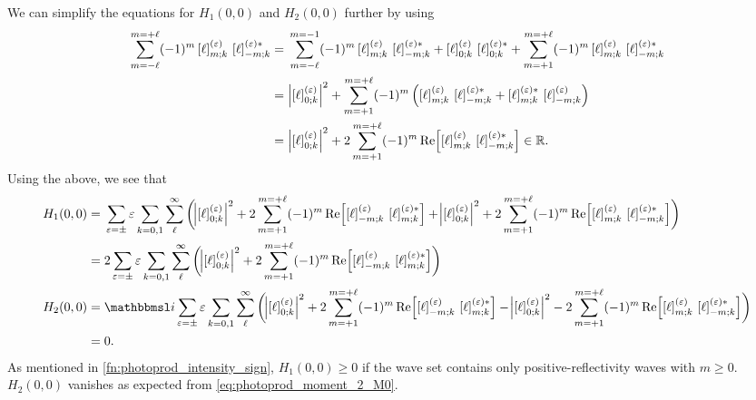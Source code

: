 We can simplify the equations for $H_1(0, 0)$ and $H_2(0, 0)$ further
by using
\begin{align}
  \sum_{m = -\ell}^{m = +\ell}
  (-1)^m \sBrk{\ell}^{(\refl)}_{m; k}\, \sBrk{\ell}^{(\refl) *}_{{-m}; k}
  ={}& \sum_{m = -\ell}^{m = -1}
  (-1)^m \sBrk{\ell}^{(\refl)}_{m; k}\, \sBrk{\ell}^{(\refl) *}_{{-m}; k}
  + \sBrk{\ell}^{(\refl)}_{0; k}\, \sBrk{\ell}^{(\refl) *}_{0; k}
  + \sum_{m = +1}^{m = +\ell}
  (-1)^m \sBrk{\ell}^{(\refl)}_{m; k}\, \sBrk{\ell}^{(\refl) *}_{{-m}; k} \nonumber
  \\
  ={}& \Abs[2]{\sBrk{\ell}^{(\refl)}_{0; k}}^2
  + \sum_{m = +1}^{m = +\ell}
  (-1)^m \rBrk[2]{\sBrk{\ell}^{(\refl)}_{m; k}\, \sBrk{\ell}^{(\refl) *}_{{-m}; k} + \sBrk{\ell}^{(\refl) *}_{m; k}\, \sBrk{\ell}^{(\refl)}_{{-m}; k}} \nonumber
  \\
  ={}& \Abs[2]{\sBrk{\ell}^{(\refl)}_{0; k}}^2
  + 2 \sum_{m = +1}^{m = +\ell}
  (-1)^m \Re[2]{\sBrk{\ell}^{(\refl)}_{m; k}\, \sBrk{\ell}^{(\refl) *}_{{-m}; k}}
  \in \mathbb{R}.
\end{align}
Using the above, we see that
\begin{align}
  H_1(0, 0)
  ={}& \sum_{\refl = \pm} \refl \sum_{k = 0, 1} \sum_{\ell}^\infty
  \rBrk[3]{\Abs[2]{\sBrk{\ell}^{(\refl)}_{0; k}}^2
  + 2 \sum_{m = +1}^{m = +\ell}
  (-1)^m \Re[2]{\sBrk{\ell}^{(\refl)}_{{-m}; k}\, \sBrk{\ell}^{(\refl) *}_{m; k}}
  + \Abs[2]{\sBrk{\ell}^{(\refl)}_{0; k}}^2
  + 2 \sum_{m = +1}^{m = +\ell}
  (-1)^m \Re[2]{\sBrk{\ell}^{(\refl)}_{m; k}\, \sBrk{\ell}^{(\refl) *}_{{-m}; k}}} \nonumber
  \\
  ={}& 2 \sum_{\refl = \pm} \refl \sum_{k = 0, 1} \sum_{\ell}^\infty
  \rBrk[3]{\Abs[2]{\sBrk{\ell}^{(\refl)}_{0; k}}^2
  + 2 \sum_{m = +1}^{m = +\ell}
  (-1)^m \Re[2]{\sBrk{\ell}^{(\refl)}_{{-m}; k}\, \sBrk{\ell}^{(\refl) *}_{m; k}}}
  \\
  H_2(0, 0)
  ={}& \imag \sum_{\refl = \pm} \refl \sum_{k = 0, 1} \sum_{\ell}^\infty
  \rBrk[3]{\Abs[2]{\sBrk{\ell}^{(\refl)}_{0; k}}^2
  + 2 \sum_{m = +1}^{m = +\ell}
  (-1)^m \Re[2]{\sBrk{\ell}^{(\refl)}_{{-m}; k}\, \sBrk{\ell}^{(\refl) *}_{m; k}}
  - \Abs[2]{\sBrk{\ell}^{(\refl)}_{0; k}}^2
  - 2 \sum_{m = +1}^{m = +\ell}
  (-1)^m \Re[2]{\sBrk{\ell}^{(\refl)}_{m; k}\, \sBrk{\ell}^{(\refl) *}_{{-m}; k}}} \nonumber
  \\
  ={}& 0.
\end{align}
As mentioned in \cref{fn:photoprod_intensity_sign}, $H_1(0, 0) \geq 0$
if the wave set contains only positive-reflectivity waves with $m \geq
0$.  $H_2(0, 0)$ vanishes as expected from
\cref{eq:photoprod_moment_2_M0}.


